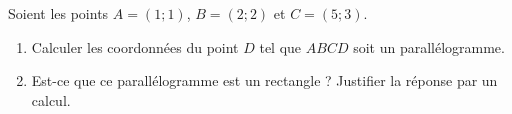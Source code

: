 
\begin{exercice}\label{exosmath-0027}

    Soient les points \( A=(1;1)\), \( B=(2;2)\) et \( C=(5;3)\). 
    \begin{enumerate}
        \item
            Calculer les coordonnées du point \( D\) tel que \( ABCD\) soit un parallélogramme.
        \item
            Est-ce que ce parallélogramme est un rectangle ? Justifier la réponse par un calcul.
    \end{enumerate}

\end{exercice}
